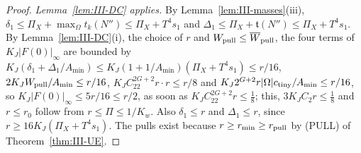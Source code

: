 \documentclass[10pt]{amsart}
\theoremstyle{definition}
\theoremstyle{remark}
\begin{document}
\begin{proof}
\emph{Lemma~\ref{lem:III-DC} applies.}  By Lemma~\ref{lem:III-masses}(iii),
$\delta_1\le\Pi_X+\max_{\Omega}t_k(N'')\le\Pi_X+T^4s_1$ and $\Delta_1\le\Pi_X+
\mathfrak t(N'')\le\Pi_X+T^4s_1$.  By Lemma~\ref{lem:III-DC}(i), the choice
of $r$ and $W_{\rm pull}\le\overline W_{\rm pull}$, the four terms of
$K_J|F(0)|_\infty$ are bounded by
$K_J(\delta_1+\Delta_1/A_{\min})\le K_J(1+1/A_{\min})(\Pi_X+T^4s_1)\le r/16$,
$2K_JW_{\rm pull}/A_{\min}\le r/16$, $K_JC_22^{2G+2}r\cdot r\le r/8$ and
$K_J2^{G+2}r|\Omega|c_{\rm tiny}/A_{\min}\le r/16$, so
$K_J|F(0)|_\infty\le5r/16\le r/2$, as soon as $K_JC_22^{2G+2}r\le\frac18$;
this, $3K_JC_2r\le\frac18$ and $r\le r_0$ follow from $r\le\Pi\le1/K_w$.
Also $\delta_1\le r$ and $\Delta_1\le r$, since $r\ge16K_J(\Pi_X+T^4s_1)$.
The pulls exist because $r\ge r_{\min}\ge r_{\rm pull}$ by
\textup{(PULL)} of Theorem~\ref{thm:III-UE}.


\end{proof}
\end{document}
